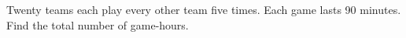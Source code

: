 Twenty teams each play every other team five times. Each game lasts 90 minutes. Find the total number of game-hours.
